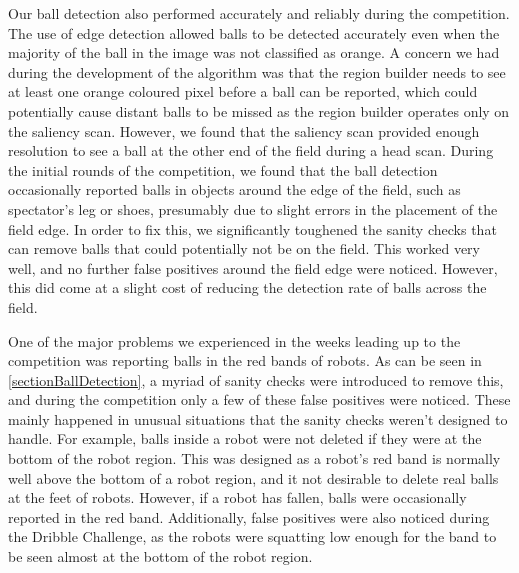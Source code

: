 \documentclass[pdftex,11pt,a4paper]{report}
\begin{document}
Our ball detection also performed accurately and reliably during the competition. The use of edge detection allowed balls to be detected accurately even when the majority of the ball in the image was not classified as orange. A concern we had during the development of the algorithm was that the region builder needs to see at least one orange coloured pixel before a ball can be reported, which could potentially cause distant balls to be missed as the region builder operates only on the saliency scan. However, we found that the saliency scan provided enough resolution to see a ball at the other end of the field during a head scan. During the initial rounds of the competition, we found that the ball detection occasionally reported balls in objects around the edge of the field, such as spectator's leg or shoes, presumably due to slight errors in the placement of the field edge. In order to fix this, we significantly toughened the sanity checks that can remove balls that could potentially not be on the field. This worked very well, and no further false positives around the field edge were noticed. However, this did come at a slight cost of reducing the detection rate of balls across the field. 

One of the major problems we experienced in the weeks leading up to the competition was reporting balls in the red bands of robots. As can be seen in \autoref{sectionBallDetection}, a myriad of sanity checks were introduced to remove this, and during the competition only a few of these false positives were noticed. These mainly happened in unusual situations that the sanity checks weren't designed to handle. For example, balls inside a robot were not deleted if they were at the bottom of the robot region. This was designed as a robot's red band is normally well above the bottom of a robot region, and it not desirable to delete real balls at the feet of robots. However, if a robot has fallen, balls were occasionally reported in the red band. Additionally, false positives were also noticed during the Dribble Challenge, as the robots were squatting low enough for the band to be seen almost at the bottom of the robot region.
\end{document}
